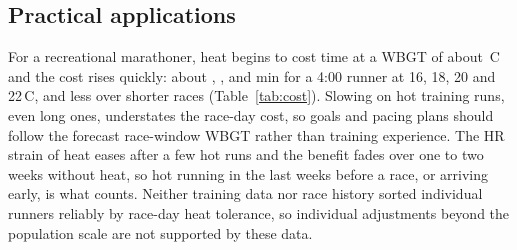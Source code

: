 \documentclass[12pt]{article}
\newcommand{\degC}{\,\textdegree C}
\begin{document}
\subsection{Practical applications}
For a recreational marathoner, heat begins to cost time at a WBGT of about \costStartRange\degC{} and the cost rises quickly: about \marMinSixteen, \marMinEighteen, \marMinTwenty{} and \marMinTwentytwo{} min for a 4:00 runner at 16, 18, 20 and 22\degC, and less over shorter races (Table~\ref{tab:cost}). Slowing on hot training runs, even long ones, understates the race-day cost, so goals and pacing plans should follow the forecast race-window WBGT rather than training experience. The HR strain of heat eases after a few hot runs and the benefit fades over one to two weeks without heat, so hot running in the last weeks before a race, or arriving early, is what counts. Neither training data nor race history sorted individual runners reliably by race-day heat tolerance, so individual adjustments beyond the population scale are not supported by these data.
\end{document}
